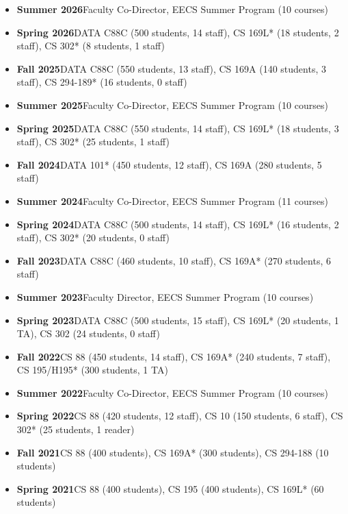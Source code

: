 \newcommand{\semester}[2]{\item{\textbf{#1}\newline}#2}

\begin{itemize}
    \setlength\itemsep{0.7em}

    \semester{Summer 2026}{Faculty Co-Director, EECS Summer Program (10 courses)}

    \semester{Spring 2026} {DATA C88C (500 students, 14 staff), CS 169L* (18 students, 2 staff), CS 302* (8 students, 1 staff)}

    \semester{Fall 2025}{DATA C88C (550 students, 13 staff), CS 169A (140 students, 3 staff), CS 294-189* (16 students, 0 staff)}

    \semester{Summer 2025}{Faculty Co-Director, EECS Summer Program (10 courses)}

    \semester{Spring 2025} {DATA C88C (550 students, 14 staff), CS 169L* (18 students, 3 staff), CS 302* (25 students, 1 staff)}

    \semester{Fall 2024}{DATA 101* (450 students, 12 staff), CS 169A (280 students, 5 staff)}

    \semester{Summer 2024}{Faculty Co-Director, EECS Summer Program (11 courses)}
    
    \semester{Spring 2024} {DATA C88C (500 students, 14 staff), CS 169L* (16 students, 2 staff), CS 302* (20 students, 0 staff)}
    
    \semester{Fall 2023} {DATA C88C (460 students, 10 staff), CS 169A* (270 students, 6 staff)}

    \semester{Summer 2023}{Faculty Director, EECS Summer Program (10 courses)}

    \semester{Spring 2023} {DATA C88C (500 students, 15 staff), CS 169L* (20 students, 1 TA), CS 302 (24 students, 0 staff)}
    
    \semester{Fall 2022}{CS 88 (450 students, 14 staff), CS 169A* (240 students, 7 staff), CS 195/H195* (300 students, 1 TA)} 

    \semester{Summer 2022}{Faculty Co-Director, EECS Summer Program (10 courses)}

    \semester{Spring 2022} {CS 88 (420 students, 12 staff), CS 10 (150 students, 6 staff), CS 302* (25 students, 1 reader)}

    \semester{Fall 2021} {CS 88 (400 students), CS 169A* (300 students), CS 294-188 (10 students)}

    \semester{Spring 2021} {CS 88 (400 students), CS 195 (400 students), CS 169L* (60 students)}


\end{itemize}

